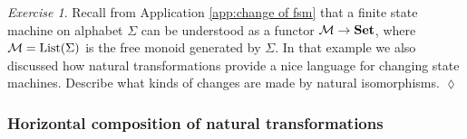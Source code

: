 \documentclass{book}
\def\tn{\textnormal}
\def\mc{\mathcal}
\def\List{\tn{List}}
\def\to{\rightarrow}
\def\Set{{\bf Set}}
\def\mcM{\mc{M}}
\theoremstyle{remark}
\newtheorem{exc}[subsubsection]{Exercise}
\newenvironment{exercise}{\begin{exc}}{\hspace*{\fill}$\lozenge$\end{exc}}
\theoremstyle{definition}
\begin{document}
\begin{exercise}
Recall from Application \ref{app:change of fsm} that a finite state machine on alphabet $\Sigma$ can be understood as a functor $\mcM\to\Set$, where $\mcM=\List(\Sigma)$ is the free monoid generated by $\Sigma$. In that example we also discussed how natural transformations provide a nice language for changing state machines. Describe what kinds of changes are made by natural isomorphisms.
\end{exercise}


\subsubsection{Horizontal composition of natural transformations}
\end{document}
